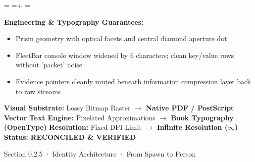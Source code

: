 \documentclass[10pt,a4paper,landscape]{article}
\newcommand{\pdautoscale}[2]{%
  \pdmaxh=#1\relax
  \pdmaxw=#2\relax
  \sbox{\pdscaledbox}{\usebox{\pdfigbox}}%
  \pdcurh=\dimexpr\ht\pdscaledbox+\dp\pdscaledbox\relax
  \pdcurw=\wd\pdscaledbox
  \ifdim\dimexpr\pdcurw * 100 / \pdmaxw\relax > \dimexpr\pdcurh * 100 / \pdmaxh\relax
    \resizebox{\pdmaxw}{!}{\usebox{\pdscaledbox}}%
  \else
    \resizebox{!}{\pdmaxh}{\usebox{\pdscaledbox}}%
  \fi
}
\begin{document}
\begin{minipage}[t]{0.492\linewidth}
  \begin{tcolorbox}[
    colback=pdcobalt!3,colframe=pdcobalt!85!black,arc=1.5pt,
    boxrule=0.7pt,top=1.5pt,bottom=1.5pt,left=4pt,right=4pt,
    title={\pdgrotesk\footnotesize\bfseries \color{white} B. Authoritative Native Vector Replacement \hfill \texttt{.tex / TikZ / PGF}}
  ]
    \begin{minipage}[c][8.3cm][c]{\linewidth}
      \centering
      \sbox{\pdfigbox}{}
      \pdautoscale{8.0cm}{\linewidth}
    \end{minipage}
    \tcblower
    \begin{minipage}[t][2.0cm][t]{\linewidth}
      \pdgrotesk\scriptsize
      \textbf{{\color{pdcobalt} Engineering \& Typography Guarantees:}}\\
      \begin{itemize}[leftmargin=9pt,itemsep=0pt,topsep=0.5pt,parsep=0pt]
        \item Prism geometry with optical facets and central diamond aperture dot
        \item FleetBar console window widened by 6 characters; clean key/value rows without 'packet' noise
        \item Evidence pointers cleanly routed beneath information compression layer back to raw streams
      \end{itemize}
    \end{minipage}
  \end{tcolorbox}
\end{minipage}

\vspace*{0.05cm}
\noindent
\begin{tcolorbox}[
  colback=hhpaper,colframe=hhgray!35,arc=1.5pt,boxrule=0.4pt,
  top=1.5pt,bottom=1.5pt,left=6pt,right=6pt
]
  \pdgrotesk\scriptsize
  \noindent
  \textbf{Visual Substrate:} Lossy Bitmap Raster $\rightarrow$ \textbf{\color{pdcobalt}Native PDF / PostScript Vector}\hfill
  \textbf{Text Engine:} Pixelated Approximations $\rightarrow$ \textbf{\color{pdcobalt}Book Typography (OpenType)}\hfill
  \textbf{Resolution:} Fixed DPI Limit $\rightarrow$ \textbf{\color{pdcobalt}Infinite Resolution ($\infty$)}\hfill
  \textbf{Status:} \textbf{\color{pdteal}RECONCILED \& VERIFIED}
\end{tcolorbox}
\clearpage

\noindent
\begin{minipage}[t]{\linewidth}
  \hfill
  {\pdgrotesk\footnotesize\color{hhgray} Section 0.2.5 · Identity Architecture · From Spawn to Person}\\
  \vspace*{0.03cm}
  \noindent{\color{hhgray!40}\rule{\linewidth}{0.5pt}}
\end{minipage}
\end{document}
